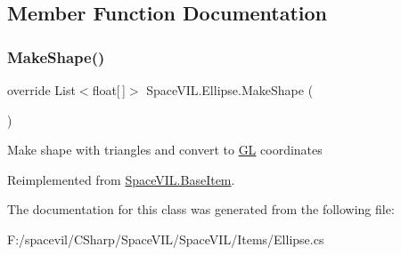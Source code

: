 \subsection{Member Function Documentation}
\mbox{\label{class_space_v_i_l_1_1_ellipse_aa2311fd87e9a988eca0d754ad6e9093d}} 
\subsubsection{\texorpdfstring{Make\+Shape()}{MakeShape()}}
{\footnotesize\ttfamily override List$<$float\mbox{[}$\,$\mbox{]}$>$ Space\+V\+I\+L.\+Ellipse.\+Make\+Shape (\begin{DoxyParamCaption}{ }\end{DoxyParamCaption})\hspace{0.3cm}{\ttfamily [virtual]}}



Make shape with triangles and convert to \mbox{\hyperlink{namespace_g_l}{GL}} coordinates 



Reimplemented from \mbox{\hyperlink{class_space_v_i_l_1_1_base_item_ac111d3d8cef36f406aa11862cefab9e2}{Space\+V\+I\+L.\+Base\+Item}}.



The documentation for this class was generated from the following file\+:\begin{DoxyCompactItemize}
\item 
F\+:/spacevil/\+C\+Sharp/\+Space\+V\+I\+L/\+Space\+V\+I\+L/\+Items/Ellipse.\+cs\end{DoxyCompactItemize}
